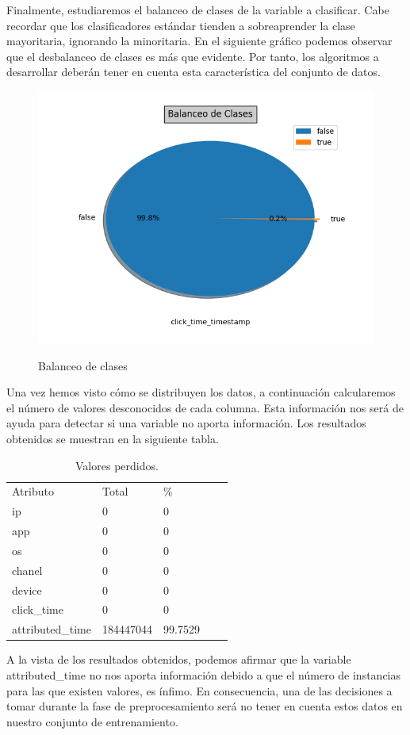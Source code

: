 Finalmente, estudiaremos el balanceo de clases de la variable a clasificar. Cabe recordar que los clasificadores estándar tienden a sobreaprender la clase mayoritaria, ignorando la minoritaria. En el siguiente gráfico podemos observar que el desbalanceo de clases es más que evidente. Por tanto, los algoritmos a desarrollar deberán tener en cuenta esta característica del conjunto de datos.
\begin{figure}[H]
\includegraphics[scale=0.65]{img/imbalacing.png}
\label{}
\caption{Balanceo de clases}
\end{figure}

Una vez hemos visto cómo se distribuyen los datos, a continuación calcularemos el número de valores desconocidos de cada columna. Esta información nos será de ayuda para detectar si una variable no aporta información. Los resultados obtenidos se muestran en la siguiente tabla.
\begin{table}[H]
	\centering
	\begin{tabular}{lllll}
	Atributo& Total & \%    \\
	ip	& 0 &0 \\
	app	& 0 & 0   \\
	os	& 0 & 0 \\
	chanel &0 & 0 \\
	device & 0 & 0  \\
	click\_time& 0& 0 \\
	attributed\_time &184447044& 99.7529
	\end{tabular}
	\caption{Valores perdidos.}
\label{}
\end{table}
A la vista de los resultados obtenidos, podemos afirmar que la variable attributed\_time no nos aporta información debido a que el número de instancias para las que existen valores, es ínfimo. En consecuencia, una de las decisiones a tomar durante la fase de preprocesamiento será no tener en cuenta estos datos en nuestro conjunto de entrenamiento.
\medskip

